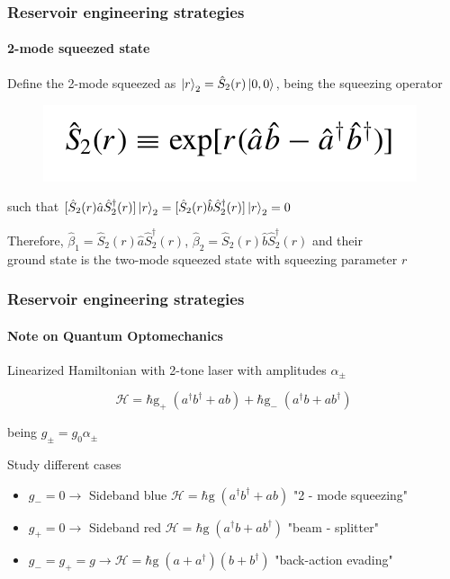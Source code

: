 \documentclass[aspectratio=43]{beamer}
\begin{document}
\begin{frame}
	
	\frametitle{Reservoir engineering strategies}
	\framesubtitle{2-mode squeezed state}
	
	Define the 2-mode squeezed as $\ket{r}_{2} = \hat{S}_{2}(r) \ket{0,0}$, being the squeezing operator
	\begin{figure}
		\includegraphics[width = 5 cm]{plots/2_squeezed_mode.png}
	\end{figure}	

	such that $[\hat{S}_{2}(r) \hat{a} \hat{S}_{2}^{\dagger}(r)]\ket{r}_{2} = [\hat{S}_{2}(r) \hat{b} \hat{S}_{2}^{\dagger}(r)]\ket{r}_{2} = 0$\\
	
	\vspace{0.5cm}
	
	Therefore, $\hat{\beta}_{1} = \hat{S}_{2}(r) \hat{a} \hat{S}_{2}^{\dagger}(r)$, $\hat{\beta}_{2} = \hat{S}_{2}(r) \hat{b} \hat{S}_{2}^{\dagger}(r)$ and their\\ground state is the two-mode squeezed state with squeezing parameter $r$

\end{frame}

\begin{frame}
	
	\frametitle{Reservoir engineering strategies}
	\framesubtitle{Note on Quantum Optomechanics}
	
	{\color{blue}Linearized} Hamiltonian with 2-tone laser with amplitudes $\alpha_{\pm}$
	
	\begin{equation}
	\mathcal{H} = \hbar \textrm{g}_{+} \; (a^{\dagger}b^{\dagger} + ab) + \hbar \textrm{g}_{-} \; (a^{\dagger}b + ab^{\dagger}) \nonumber
	\end{equation}
	
	being $g_{\pm} = g_{0} \alpha_{\pm}$\\

	\vspace{0.5 cm}
	
	Study different cases
	
	\begin{itemize}
		\item $g_{-} = 0 \longrightarrow$ Sideband blue $\mathcal{H} = \hbar \textrm{g} \; (a^{\dagger}b^{\dagger} + ab)$ "2 - mode squeezing"
		\item $g_{+} = 0 \longrightarrow$ Sideband red $\mathcal{H} = \hbar \textrm{g} \; (a^{\dagger}b + ab^{\dagger})$ "beam - splitter"
		\item $g_{-} = g_{+} = g \longrightarrow \mathcal{H} = \hbar \textrm{g} \; (a + a^{\dagger})(b + b^{\dagger})$ "back-action evading"
	\end{itemize}	

\end{frame}
\end{document}
